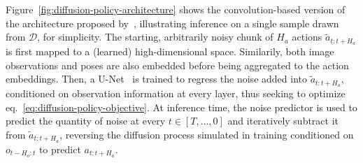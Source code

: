Figure~\ref{fig:diffusion-policy-architecture} shows the convolution-based version of the architecture proposed by~\citet{chiDiffusionPolicyVisuomotor2024}, illustrating inference on a single sample drawn from \( \mathcal D \), for simplicity.
The starting, arbitrarily noisy chunk of \( H_a \) actions \(\tilde a_{t:t+H_a} \) is first mapped to a (learned) high-dimensional space.
Similarily, both image observations and poses are also embedded before being aggregated to the action embeddings.
Then, a U-Net~\citep{ronnebergerUNetConvolutionalNetworks2015} is trained to regress the noise added into \( \tilde a_{t:t+H_a} \), conditioned on observation information at every layer, thus seeking to optimize eq.~\ref{eq:diffusion-policy-objective}.
At inference time, the noise predictor is used to predict the quantity of noise at every \( t \in [T, \dots, 0 ] \) and iteratively subtract it from \(\tilde a_{t:t+H_a} \), reversing the diffusion process simulated in training conditioned on \(o_{t-H_o:t} \) to predict \(a_{t:t+H_a} \).

